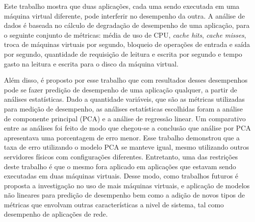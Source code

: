 Este trabalho mostra que duas aplicações, cada uma sendo executada em uma máquina virtual diferente, pode interferir no desempenho da outra. A análise de dados é baseada no cálculo de degradação de desempenho de uma aplicação, para o seguinte conjunto de métricas: média de uso de CPU, \textit{cache hits}, \textit{cache misses}, troca de máquinas virtuais por segundo, bloqueio de operações de entrada e saída por segundo, quantidade de requisição de leitura e escrita por segundo e tempo gasto na leitura e escrita para o disco da máquina virtual. %


Além disso, é proposto por esse trabalho que com resultados desses desempenhos pode se fazer predição de desempenho de uma aplicação qualquer, a partir de análises estatísticas. Dado a quantidade variáveis, que são as métricas utilizadas para medição de desempenho, as análises estatísticas escolhidas foram a análise de componente principal (PCA) e a análise de regressão linear. Um comparativo entre as análises foi feito de modo que chegou-se a conclusão que análise por PCA apresentava uma porcentagem de erro menor. Esse trabalho demonstrou que a taxa de erro utilizando o modelo PCA se manteve igual, mesmo utilizando outros servidores físicos com configurações diferentes. Entretanto, uma das restrições deste trabalho é que o mesmo fora aplicado em aplicações que estavam sendo executadas em duas máquinas virtuais. Desse modo, como trabalhos futuros é proposta a investigação no uso de mais máquinas virtuais, e aplicação de modelos não lineares para predição de desempenho bem como a adição de novos tipos de métricas que envolvam outras características a nivel de sistema, tal como desempenho de aplicações de rede.

